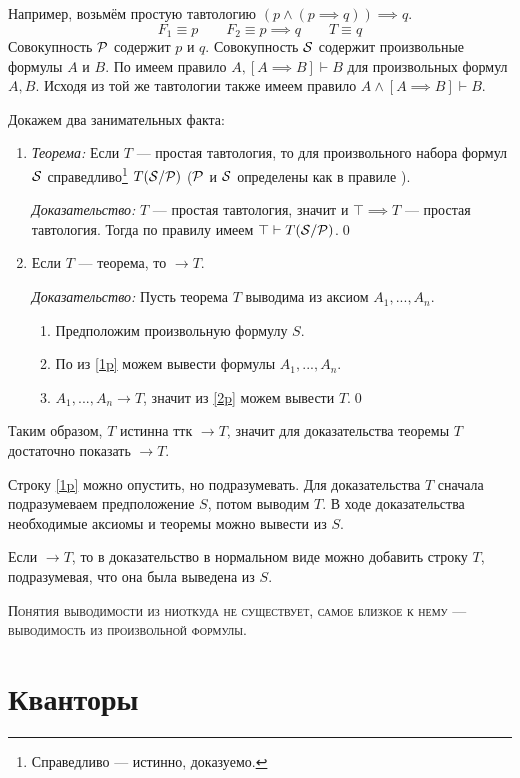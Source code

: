 Например, возьмём простую тавтологию $(p\land (p\implies q))\implies q$.
\[
	F_1\equiv p\qquad F_2\equiv p\implies q\qquad T\equiv q
\]
Совокупность $\mathcal P$ содержит $p$ и $q$.
Совокупность $\mathcal S$ содержит произвольные формулы $A$ и $B$.
По \taut{} имеем правило ${A,[A\implies B]\vdash B}$
для произвольных формул $A,B$.
Исходя из той же тавтологии также имеем правило ${A\land[A\implies B]\vdash B}$.

Докажем два занимательных факта:
\begin{enumerate}
	\item{}
		{\it Теорема:}
		Если $T$ --- простая тавтология, то
		для произвольного набора формул $\mathcal S$ справедливо\footnote{
			Справедливо --- истинно, доказуемо.
		} $T(\mathcal S/\mathcal P)$
		($\mathcal P$ и $\mathcal S$ определены как в правиле \taut{}).

		{\it Доказательство:}
		$T$ --- простая тавтология, значит и
		${\top\implies T}$ --- простая тавтология. Тогда по правилу \taut{} имеем
		$\top\vdash T(\mathcal S/\mathcal P)$.\qed

	\item{}Если $T$ --- теорема, то $\to T$.

		{\it Доказательство:}
		Пусть теорема $T$ выводима из аксиом $A_1,...,A_{n}$.
		\begin{enumerate}[label=(\roman*)]
			\item{}\label{1p}Предположим произвольную формулу $S$.
			\item{}\label{2p}По \axiom{} из \ref{1p} можем вывести
				формулы $A_1,...,A_{n}$.
			\item{}\label{3p}$A_1,...,A_{n}\to T$, значит из \ref{2p} можем вывести $T$.\qed
		\end{enumerate}
\end{enumerate}

Таким образом, $T$ истинна ттк $\to T$, значит для доказательства теоремы $T$
достаточно показать $\to T$.

Строку \ref{1p} можно опустить, но подразумевать.
Для доказательства $T$ сначала подразумеваем предположение $S$, потом
выводим $T$. В ходе доказательства необходимые
аксиомы и теоремы можно вывести из $S$.

Если $\to T$, то в доказательство в нормальном виде
можно добавить строку $T$, подразумевая, что она была выведена из $S$.

\textsc{Понятия выводимости из ниоткуда не существует,
самое близкое к нему --- выводимость из произвольной формулы.}

\section{Кванторы}

